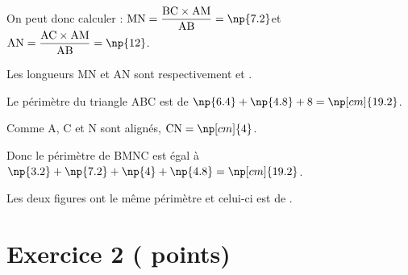 \documentclass[12pt,a4paper,french]{article}
\begin{document}
\begin{énumérer}
	On peut donc calculer : \quad
	{$\text{MN}=\dfrac{\text{BC}\times\text{AM}}{\text{AB}}=\np{7.2}$}\quad et \quad
	{$\text{AN}=\dfrac{\text{AC}\times\text{AM}}{\text{AB}}=\np{12}$}.

	Les longueurs MN et AN sont respectivement  et .

	\item Le périmètre du triangle ABC est de {$\np{6.4}+\np{4.8}+8=\np[cm]{19.2}$}.

	Comme A, C et N sont alignés, {$\text{CN}=\np[cm]{4}$}.

	Donc le périmètre de BMNC est égal à {$\np{3.2}+\np{7.2}+\np{4}+\np{4.8}=\np[cm]{19.2}$}.

	Les deux figures ont le même périmètre et celui-ci est de .
\end{énumérer}


\section*{Exercice 2 ( points)}
\end{document}
